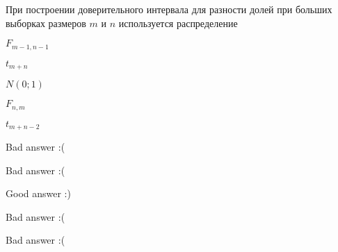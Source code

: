 
\begin{question}
При построении доверительного интервала для разности долей при больших
выборках размеров \(m\) и \(n\) используется распределение
\begin{answerlist}
  \item \(F_{m-1, n-1}\)
  \item \(t_{m+n}\)
  \item \(N(0;1)\)
  \item \(F_{n,m}\)
  \item \(t_{m+n-2}\)
\end{answerlist}
\end{question}

\begin{solution}
\begin{answerlist}
  \item Bad answer :(
  \item Bad answer :(
  \item Good answer :)
  \item Bad answer :(
  \item Bad answer :(
\end{answerlist}
\end{solution}

